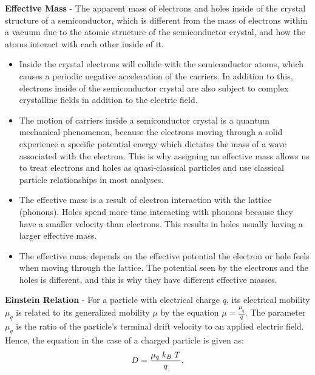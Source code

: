 \vspace{0.5cm}
\noindent
    \textbf{Effective Mass} - The apparent mass of electrons and holes inside of the crystal structure of a semiconductor, which is different from the mass of electrons within a vacuum due to the atomic structure of the semiconductor crystal, and how the atoms interact with each other inside of it.
    \vspace{0.15cm}
    \begin{itemize}
        \setlength\itemsep{0.5em}
        \item{Inside the crystal electrons will collide with the semiconductor atoms, which causes a periodic negative acceleration of the carriers. In addition to this, electrons inside of the semiconductor crystal are also subject to complex crystalline fields in addition to the electric field.}
        \item{The motion of carriers inside a semiconductor crystal is a quantum mechanical phenomenon, because the electrons moving through a solid experience a specific potential energy which dictates the mass of a wave associated with the electron.  This is why assigning an effective mass allows us to treat electrons and holes as quasi-classical particles and use classical particle relationships in most analyses.}
        \item{The effective mass is a result of electron interaction with the lattice (phonons).  Holes spend more time interacting with phonons because they have a smaller velocity than electrons.  This results in holes usually having a larger effective mass.}
        \item{The effective mass depends on the effective potential the electron or hole feels when moving through the lattice.  The potential seen by the electrons and the holes is different, and this is why they have different effective masses.}
    \end{itemize}
\vspace{0.5cm}
    \textbf{Einstein Relation} - For a particle with electrical charge $q$, its electrical mobility $\mu_q$ is related to its generalized mobility $\mu$ by the equation $\mu = \frac{\mu_q}{q}$. The parameter $\mu_q$ is the ratio of the particle's terminal drift velocity to an applied electric field. Hence, the equation in the case of a charged particle is given as:
    \begin{equation}
        \large{D = \frac{\mu_q\;k_B\;T}{q},}
    \end{equation}
